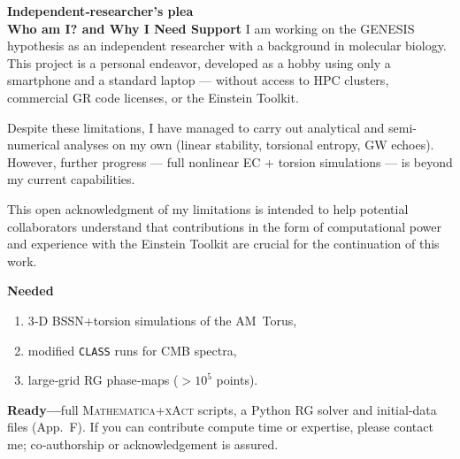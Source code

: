 \documentclass{article}
\begin{document}
\begin{tcolorbox}[
  enhanced,
  width=\linewidth,
  colframe=black,
  colback=gray!8,
  coltitle=white,
  colbacktitle=black,
  title=Call for Collaboration,
  fonttitle=\bfseries,
  left=2mm, right=2mm, top=1mm, bottom=1mm,
  boxrule=0.4pt
]
\textbf{Independent‑researcher’s plea}\\
\textbf{Who am I? and Why I Need Support}
I am working on the GENESIS hypothesis as an independent researcher with a background in molecular biology. This project is a personal endeavor, developed as a hobby using only a smartphone and a standard laptop — without access to HPC clusters, commercial GR code licenses, or the Einstein Toolkit.

Despite these limitations, I have managed to carry out analytical and semi-numerical analyses on my own (linear stability, torsional entropy, GW echoes). However, further progress — full nonlinear EC + torsion simulations — is beyond my current capabilities.

This open acknowledgment of my limitations is intended to help potential collaborators understand that contributions in the form of computational power and experience with the Einstein Toolkit are crucial for the continuation of this work.

\medskip
\textbf{Needed}\\[-0.8em]
\begin{enumerate}
  \item 3‑D BSSN{+}torsion simulations of the AM Torus,
  \item modified \texttt{CLASS} runs for CMB spectra,
  \item large‑grid RG phase‑maps ($>10^{5}$ points).
\end{enumerate}

\medskip
\textbf{Ready—}full \textsc{Mathematica{+}xAct} scripts, a Python RG solver and initial‑data files (App.~F).  
If you can contribute compute time or expertise, please contact me; co‑authorship or acknowledgement is assured.
\end{tcolorbox}







\end{document}
